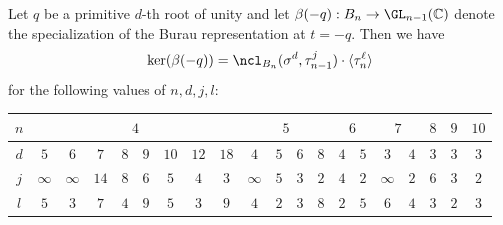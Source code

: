 \documentclass{amsart}
\begin{document}
    \begin{theorem}\label{thm:Burau_roots_of_unity}
        Let $q$ be a primitive $d$-th root of unity and let $\beta(-q):B_n \to \GL_{n-1}(\mathbb C)$ denote the specialization of the Burau representation at $t=-q$. Then we have 
        \begin{equation}
            \ker (\beta(-q)) = \ncl_{B_n}(\sigma^d,\tau_{n-1}^j) \cdot \langle \tau_n^\ell \rangle \label{eqn:kernel_in_special_cases}
        \end{equation}
        for the following values of $n,d,j,l$:

        \begin{center}
        
            
            \begin{tabular}{c||cccccccc|cccc|cc|cc|c|c|c}
                $n$ & \multicolumn{8}{c|}{$4$}                                    & \multicolumn{4}{c|}{$5$}          & \multicolumn{2}{c|}{$6$} & \multicolumn{2}{c|}{$7$}  & $8$ & $9$ & $10$ \\ \hline
                $d$ & $5$ & $6$ & $7$ & $8$ & $9$ & $10$ & $12$ & $18$ & $4$ & $5$ & $6$ & $8$ & $4$ & $5$ & $3$ & $4$ & $3$ & $3$ & $3$  \\
                $j$ & $\infty$ & $\infty$ & $14$ & $8$ & $6$ & $5$  & $4$  & $3$  & $\infty$ & $5$ & $3$ & $2$ & $4$  & $2$ & $\infty$ & $2$ & $6$ & $3$ & $2$  \\
                $l$ & $5$ & $3$ & $7$ & $4$ & $9$ & $5$ & $3$ & $9$ & $4$ & $2$ & $3$ & $8$ & $2$ & $5$ & $6$ & $4$ & $3$ & $2$ & $3$ 
            \end{tabular}
        \end{center}


\end{theorem}
\end{document}

